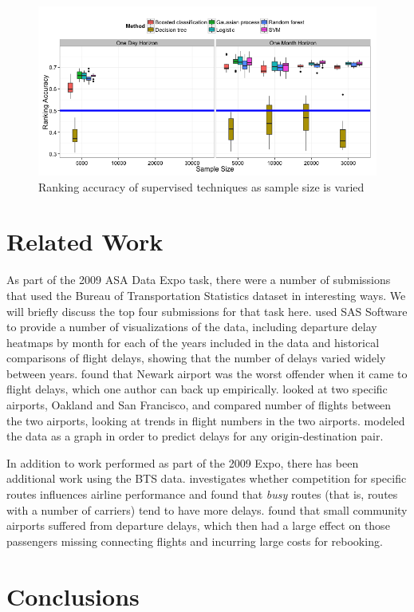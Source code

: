 \documentclass{article}
\begin{document}
\begin{figure}
    \centering
    \includegraphics[width=\textwidth]{figures/performance-by-sample-size.png}
    \caption{Ranking accuracy of supervised techniques as sample size is varied}
\end{figure}

\section{Related Work}

As part of the 2009 ASA Data Expo task, there were a number of submissions that used the Bureau of Transportation Statistics dataset in interesting ways. We will briefly discuss the top four submissions for that task here.
\cite{wicklin2009congestion} used SAS Software to provide a number of visualizations of the data, including departure delay heatmaps by month for each of the years included in the data and historical comparisons of flight delays, showing that the number of delays varied widely between years.
\cite{hofmann2011delayed} found that Newark airport was the worst offender when it came to flight delays, which one author can back up empirically.
\cite{wickham2011tale} looked at two specific airports, Oakland and San Francisco, and compared number of flights between the two airports, looking at trends in flight numbers in the two airports.
\cite{dey2009minimizing} modeled the data as a graph in order to predict delays for any origin-destination pair.

In addition to work performed as part of the 2009 Expo, there has been additional work using the BTS data.
\cite{rupp2006does} investigates whether competition for specific routes influences airline performance and found that \emph{busy} routes (that is, routes with a number of carriers) tend to have more delays.
\cite{stone2015investigating} found that small community airports suffered from departure delays, which then had a large effect on those passengers missing connecting flights and incurring large costs for rebooking.

\section{Conclusions}



\end{document}
